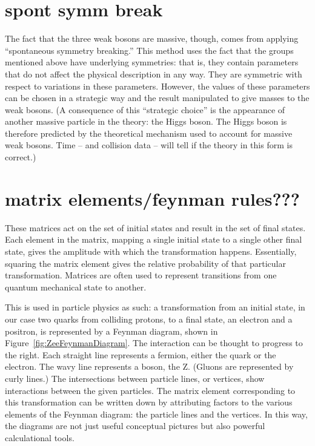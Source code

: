 \section{spont symm break}
The fact that the three weak bosons are massive, though, 
comes from applying ``spontaneous symmetry breaking.''  
This method uses the fact that the groups mentioned 
above have underlying symmetries: 
that is, they contain parameters that do not affect the 
physical description in any way.  
They are symmetric with respect to variations in these parameters.  
However, the values of these parameters can be chosen 
in a strategic way and the result manipulated %
to give masses to the weak bosons.  
(A consequence of this ``strategic choice'' is the appearance 
of another massive particle in the theory: 
the Higgs boson.  
The Higgs boson is therefore predicted by the theoretical 
mechanism used to account for massive weak bosons.  
Time -- and collision data -- will tell if the theory 
in this form is correct.)  


\section{matrix elements/feynman rules???}


These matrices act on the set of initial states 
and result in the set of final states.  
Each element in the matrix, mapping a single initial state 
to a single other final state, 
gives the amplitude with which the %
transformation happens.  
Essentially, squaring the matrix element gives the 
relative probability of that particular transformation.  
Matrices are often used to represent transitions 
from one quantum mechanical state to another.  

This is used in particle physics as such: 
a transformation from an initial state, 
in our case two quarks from colliding protons, 
to a final state, 
an electron and a positron, 
is represented by a Feynman diagram, 
shown in Figure~\ref{fig:ZeeFeynmanDiagram}.  
The interaction can be thought to progress to the right.  
Each straight line represents a fermion, 
either the quark or the electron.  
The wavy line represents a boson, the Z.  
(Gluons are represented by curly lines.)  
The intersections between particle lines, or vertices, 
show interactions between the given particles.  
The matrix element corresponding to this transformation 
can be written down 
by attributing factors to the various elements 
of the Feynman diagram: 
the particle lines and the vertices.  
In this way, the diagrams are not just useful 
conceptual pictures 
but also powerful calculational tools.  


